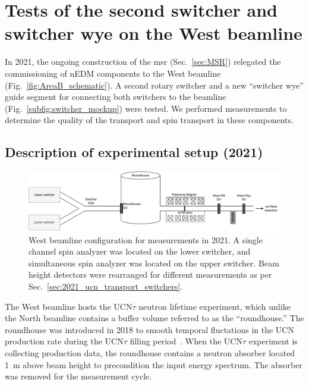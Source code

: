 
\chapter{Tests of the second switcher and switcher wye on the West beamline}\label{chap:fall2021}


In 2021, the ongoing construction of the \acrshort{msr} (Sec.~\ref{sec:MSR}) relegated the commissioning of nEDM components to the West beamline (Fig.~\ref{fig:AreaB_schematic}). A second rotary switcher and a new ``switcher wye'' guide segment for connecting both switchers to the beamline (Fig.~\ref{subfig:switcher_mockup}) were tested. We performed measurements to determine the quality of the \ucn transport and spin transport in these components.


\section{Description of experimental setup (2021)}\label{sec:2021_experimental_setup}


\begin{figure}[h]
    \centering
    \includegraphics[width=\textwidth]{figures/westbeamline_2021.pdf}
    \caption[West beamline configuration for measurements in 2021.]
    {West beamline configuration for measurements in 2021. A single channel spin analyzer was located on the lower switcher, and simultaneous spin analyzer was located on the upper switcher. Beam height detectors were rearranged for different measurements as per Sec.~\ref{sec:2021_ucn_transport_switchers}.}\label{fig:west_beamline_2021}
\end{figure}

The West beamline hosts the UCN$\tau$ neutron lifetime experiment, which unlike the North beamline contains a buffer volume referred to as the ``roundhouse.'' The roundhouse was introduced in 2018 to smooth temporal fluctations in the UCN production rate during the UCN$\tau$ filling period~\cite{gonzalez_ucn_tau}. When the UCN$\tau$ experiment is collecting production data, the roundhouse contains a neutron absorber located \qty{1}{m} above beam height to precondition the input \ucn energy spectrum. The absorber was removed for the measurement cycle. 

